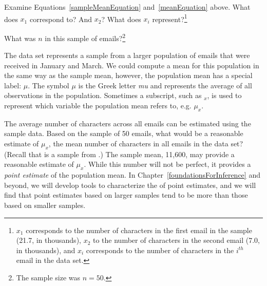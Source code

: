 \begin{exercise}
Examine Equations~\eqref{sampleMeanEquation} and~\eqref{meanEquation} above. What does $x_1$ correspond to? And $x_2$? What does $x_i$ represent?\footnote{$x_1$ corresponds to the number of characters in the first email in the sample (21.7, in thousands), $x_2$ to the number of characters in the second email (7.0, in thousands), and $x_i$ corresponds to the number of characters in the $i^{th}$ email in the data set.}
\end{exercise}

\begin{exercise}
What was $n$ in this sample of emails?\footnote{The sample size was $n=50$.}
\end{exercise}

The  data set represents a sample from a larger population of emails that were received in January and March. We could compute a mean for this population in the same way as the sample mean, however, the population mean has a special label: $\mu$.  The symbol $\mu$ is the Greek letter \emph{mu} and represents the average of all observations in the population. Sometimes a subscript, such as $_x$, is used to represent which variable the population mean refers to, e.g. $\mu_x$.

\begin{example}{The average number of characters across all emails can be estimated using the sample data. Based on the sample of 50 emails, what would be a reasonable estimate of $\mu_x$, the mean number of characters in all emails in the  data set? (Recall that  is a sample from .)}
The sample mean, 11,600, may provide a reasonable estimate of $\mu_x$. While this number will not be perfect, it provides a \emph{point estimate} of the population mean. In Chapter~\ref{foundationsForInference} and beyond, we will develop tools to characterize the   of point estimates, and we will find that point estimates based on larger samples tend to be more   than those based on smaller samples.
\end{example}


